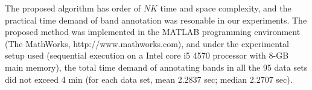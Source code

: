 The proposed algorithm has order of $NK$ time and space complexity, and the practical time demand of band annotation was resonable in our experiments. The proposed method was implemented in the MATLAB programming environment (The MathWorks, http://www.mathworks.com), and under the experimental setup used (sequential execution on a Intel core i5 4570 processor with 8-GB main memory), the total time demand of annotating bands in all the 95 data sets did not exceed 4 min (for each data set, mean 2.2837 sec; median 2.2707 sec).

